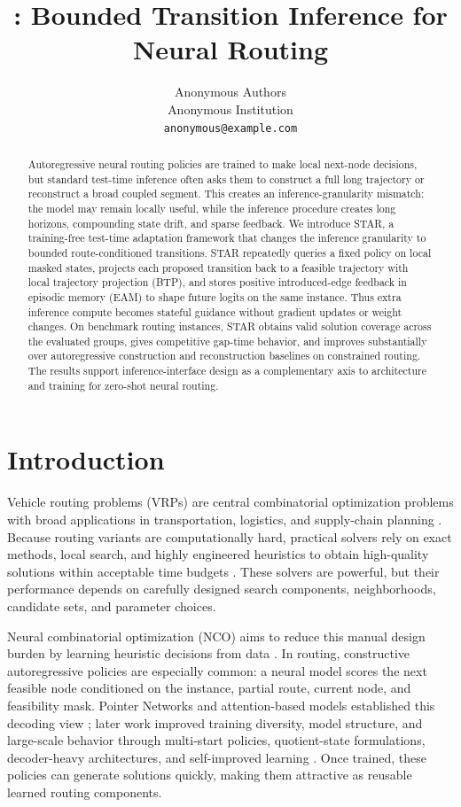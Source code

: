 \documentclass[11pt]{article}
\title{\method{}: Bounded Transition Inference for Neural Routing}
\author{Anonymous Authors\\
Anonymous Institution\\
\texttt{anonymous@example.com}}
\date{}
\newcommand{\BTP}{\textsc{BTP}}
\newcommand{\method}{\textsc{STAR}}
\newcommand{\EAM}{\textsc{EAM}}
\begin{document}
\maketitle

\begin{abstract}
Autoregressive neural routing policies are trained to make local next-node decisions, but standard test-time inference often asks them to construct a full long trajectory or reconstruct a broad coupled segment. This creates an inference-granularity mismatch: the model may remain locally useful, while the inference procedure creates long horizons, compounding state drift, and sparse feedback. We introduce \method{}, a training-free test-time adaptation framework that changes the inference granularity to bounded route-conditioned transitions. \method{} repeatedly queries a fixed policy on local masked states, projects each proposed transition back to a feasible trajectory with local trajectory projection (\BTP{}), and stores positive introduced-edge feedback in episodic memory (\EAM{}) to shape future logits on the same instance. Thus extra inference compute becomes stateful guidance without gradient updates or weight changes. On benchmark routing instances, \method{} obtains valid solution coverage across the evaluated groups, gives competitive gap-time behavior, and improves substantially over autoregressive construction and reconstruction baselines on constrained routing. The results support inference-interface design as a complementary axis to architecture and training for zero-shot neural routing.
\end{abstract}

\section{Introduction}

Vehicle routing problems (VRPs) are central combinatorial optimization problems with broad applications in transportation, logistics, and supply-chain planning \citep{VRPAPP,nrs_survey}. Because routing variants are computationally hard, practical solvers rely on exact methods, local search, and highly engineered heuristics to obtain high-quality solutions within acceptable time budgets \citep{lkhtsp,lkhcvrp,hgs}. These solvers are powerful, but their performance depends on carefully designed search components, neighborhoods, candidate sets, and parameter choices.

Neural combinatorial optimization (NCO) aims to reduce this manual design burden by learning heuristic decisions from data \citep{l2osurvey,MLCO}. In routing, constructive autoregressive policies are especially common: a neural model scores the next feasible node conditioned on the instance, partial route, current node, and feasibility mask. Pointer Networks and attention-based models established this decoding view \citep{pointernetwork,attentionmodel}; later work improved training diversity, model structure, and large-scale behavior through multi-start policies, quotient-state formulations, decoder-heavy architectures, and self-improved learning \citep{pomo,bq,lehd,sil}. Once trained, these policies can generate solutions quickly, making them attractive as reusable learned routing components.
\end{document}
